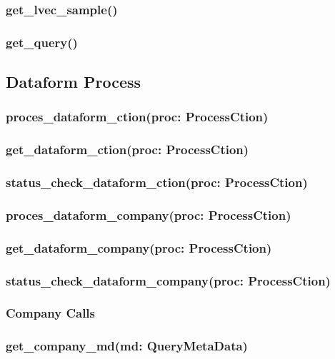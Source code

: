 \documentclass{article}
\begin{document}
\subsubsection{get_lvec_sample()}

\subsubsection{get_query()}

\subsection{Dataform Process}

\subsubsection{proces_dataform_ction(proc: ProcessCtion)}

\subsubsection{get_dataform_ction(proc: ProcessCtion)}

\subsubsection{status_check_dataform_ction(proc: ProcessCtion)}

\subsubsection{proces_dataform_company(proc: ProcessCtion)}

\subsubsection{get_dataform_company(proc: ProcessCtion)}

\subsubsection{status_check_dataform_company(proc: ProcessCtion)}

\subsubsection{Company Calls}

\subsubsection{get_company_md(md: QueryMetaData)}
\end{document}
